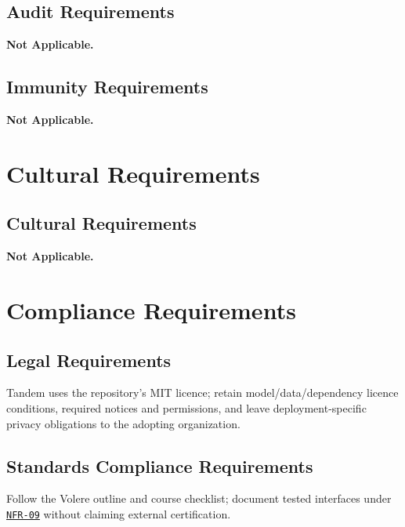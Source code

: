 \documentclass[12pt]{article}
\begin{document}
\subsection{Audit Requirements}
\textbf{Not Applicable.}

\subsection{Immunity Requirements}
\textbf{Not Applicable.}

\section{Cultural Requirements}


\subsection{Cultural Requirements}
\textbf{Not Applicable.}


\section{Compliance Requirements}


\subsection{Legal Requirements}
Tandem uses the repository's MIT licence; retain
model/data/dependency licence conditions, required notices and permissions,
and leave deployment-specific privacy obligations to the adopting organization.


\subsection{Standards Compliance Requirements}
Follow the Volere outline and course checklist; document tested interfaces
under \hyperref[req:NFR-09]{\texttt{NFR-09}} without claiming external certification.
\end{document}
